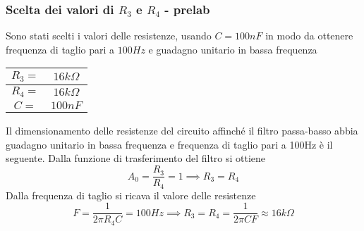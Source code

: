 \subsubsection{Scelta dei valori di $R_3$ e $R_4$ - prelab}
Sono stati scelti i valori delle resistenze, usando $C=100nF$ in modo da ottenere frequenza di taglio pari a $100Hz$ e guadagno unitario in bassa frequenza
\begin{table}[H]
    \centering
    \begin{tabular}{|c|c|}
        \hline
        $R_3=$& $16k\Omega$  \\\hline
        $R_4=$& $16k\Omega$  \\\hline
        $C=$& $100nF$ \\\hline
    \end{tabular}
\end{table}
Il dimensionamento delle resistenze del circuito affinché il filtro passa-basso abbia guadagno unitario in bassa frequenza e frequenza di taglio pari a 100Hz è il seguente. Dalla funzione di trasferimento del filtro si ottiene 
\begin{equation}
    A_0=\frac{R_3}{R_4}=1\implies R_3=R_4
\end{equation}
Dalla frequenza di taglio si ricava il valore delle resistenze
\begin{equation}
    F=\frac{1}{2\pi R_4C}=100Hz\implies R_3=R_4=\frac{1}{2\pi CF}\approx16k\Omega
\end{equation}
\clearpage
